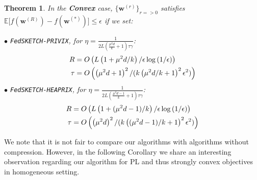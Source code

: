 \documentclass[twoside]{article}
\newtheorem{theorem}{Theorem}
\begin{document}
\begin{theorem}
In the \textbf{Convex} case, $\{ {\boldsymbol{w}}^{(r)}\}_{r=>0}$ satisfies $ \mathbb{E}\Big[f({\boldsymbol{w}}^{(R)})-f({\boldsymbol{w}}^{(*)})\Big]\leq \epsilon$ if we set:  

\noindent $\bullet$ \texttt{FedSKETCH-PRIVIX}, for $\eta=\frac{1}{2L\left(\frac{\mu^2d}{k}+1\right)\tau\gamma}$:  
\begin{equation}\notag
\begin{split}
R& =O\left(L\left(1+\mu^2d/k\right)/\epsilon\log\left(1/\epsilon \right)\right)\\
 \tau&=O\left(\left(\mu^2d+1\right)^2/(k\left(\mu^2d/k+1\right)^2\epsilon^2)\right)
  \end{split}
 \end{equation}
\noindent $\bullet$ \texttt{FedSKETCH-HEAPRIX}, for $\eta=\frac{1}{2L\left(\frac{\mu^2d-1}{k}+1\right)\tau\gamma}$: 
\begin{equation}\notag
\begin{split}
R& =O\left(L\left(1+(\mu^2d-1)/k\right)/\epsilon\log\left(1/\epsilon \right)\right)\\
 \tau&=O\left(\left(\mu^2d\right)^2/(k\left((\mu^2d-1)/k+1\right)^2\epsilon^2)\right)
  \end{split}
 \end{equation}
\end{theorem}
We note that it is not fair to compare our algorithms with algorithms without compression. 
However, in the following Corollary we share an interesting observation regarding our algorithm for PL and thus strongly convex objectives in homogeneous setting. 
\end{document}
